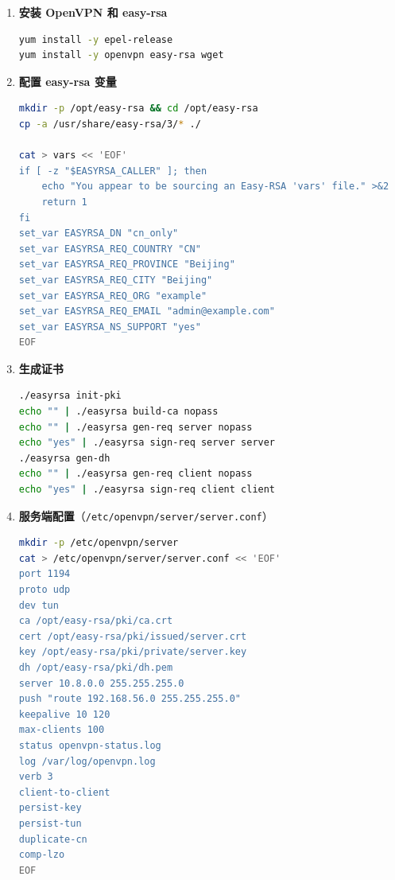 \documentclass[12pt,a4paper]{ctexart}
\begin{document}
\begin{enumerate}[label=\arabic*.,leftmargin=*]

  \item \textbf{安装 OpenVPN 和 easy-rsa}

  \begin{cmdbox}
  \begin{lstlisting}[language=bash]
yum install -y epel-release
yum install -y openvpn easy-rsa wget
  \end{lstlisting}
  \end{cmdbox}

  \item \textbf{配置 easy-rsa 变量}

  \begin{cmdbox}
  \begin{lstlisting}[language=bash]
mkdir -p /opt/easy-rsa && cd /opt/easy-rsa
cp -a /usr/share/easy-rsa/3/* ./

cat > vars << 'EOF'
if [ -z "$EASYRSA_CALLER" ]; then
    echo "You appear to be sourcing an Easy-RSA 'vars' file." >&2
    return 1
fi
set_var EASYRSA_DN "cn_only"
set_var EASYRSA_REQ_COUNTRY "CN"
set_var EASYRSA_REQ_PROVINCE "Beijing"
set_var EASYRSA_REQ_CITY "Beijing"
set_var EASYRSA_REQ_ORG "example"
set_var EASYRSA_REQ_EMAIL "admin@example.com"
set_var EASYRSA_NS_SUPPORT "yes"
EOF
  \end{lstlisting}
  \end{cmdbox}

  \item \textbf{生成证书}

  \begin{cmdbox}
  \begin{lstlisting}[language=bash]
./easyrsa init-pki
echo "" | ./easyrsa build-ca nopass
echo "" | ./easyrsa gen-req server nopass
echo "yes" | ./easyrsa sign-req server server
./easyrsa gen-dh
echo "" | ./easyrsa gen-req client nopass
echo "yes" | ./easyrsa sign-req client client
  \end{lstlisting}
  \end{cmdbox}

  \item \textbf{服务端配置}（\texttt{/etc/openvpn/server/server.conf}）

  \begin{cmdbox}
  \begin{lstlisting}[language=bash]
mkdir -p /etc/openvpn/server
cat > /etc/openvpn/server/server.conf << 'EOF'
port 1194
proto udp
dev tun
ca /opt/easy-rsa/pki/ca.crt
cert /opt/easy-rsa/pki/issued/server.crt
key /opt/easy-rsa/pki/private/server.key
dh /opt/easy-rsa/pki/dh.pem
server 10.8.0.0 255.255.255.0
push "route 192.168.56.0 255.255.255.0"
keepalive 10 120
max-clients 100
status openvpn-status.log
log /var/log/openvpn.log
verb 3
client-to-client
persist-key
persist-tun
duplicate-cn
comp-lzo
EOF
  \end{lstlisting}
  \end{cmdbox}


\end{enumerate}
\end{document}
